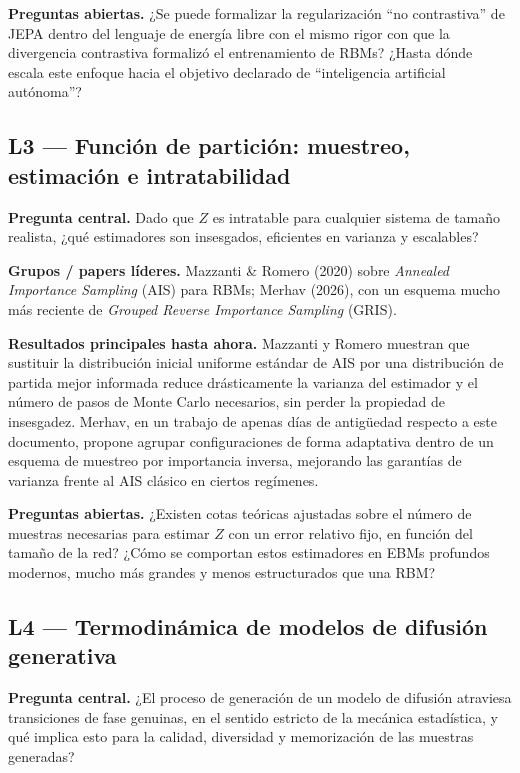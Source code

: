 \documentclass[12pt]{article}
\begin{document}
\textbf{Preguntas abiertas.} ¿Se puede formalizar la regularización ``no contrastiva'' de JEPA dentro del lenguaje de energía libre con el mismo rigor con que la divergencia contrastiva formalizó el entrenamiento de RBMs? ¿Hasta dónde escala este enfoque hacia el objetivo declarado de ``inteligencia artificial autónoma''?

\subsection{L3 --- Función de partición: muestreo, estimación e intratabilidad}

\textbf{Pregunta central.} Dado que $Z$ es intratable para cualquier sistema de tamaño realista, ¿qué estimadores son insesgados, eficientes en varianza y escalables?

\textbf{Grupos / papers líderes.} Mazzanti \& Romero (2020) sobre \emph{Annealed Importance Sampling} (AIS) para RBMs; Merhav (2026), con un esquema mucho más reciente de \emph{Grouped Reverse Importance Sampling} (GRIS).

\textbf{Resultados principales hasta ahora.} Mazzanti y Romero muestran que sustituir la distribución inicial uniforme estándar de AIS por una distribución de partida mejor informada reduce drásticamente la varianza del estimador y el número de pasos de Monte Carlo necesarios, sin perder la propiedad de insesgadez. Merhav, en un trabajo de apenas días de antigüedad respecto a este documento, propone agrupar configuraciones de forma adaptativa dentro de un esquema de muestreo por importancia inversa, mejorando las garantías de varianza frente al AIS clásico en ciertos regímenes.

\textbf{Preguntas abiertas.} ¿Existen cotas teóricas ajustadas sobre el número de muestras necesarias para estimar $Z$ con un error relativo fijo, en función del tamaño de la red? ¿Cómo se comportan estos estimadores en EBMs profundos modernos, mucho más grandes y menos estructurados que una RBM?

\subsection{L4 --- Termodinámica de modelos de difusión generativa}

\textbf{Pregunta central.} ¿El proceso de generación de un modelo de difusión atraviesa transiciones de fase genuinas, en el sentido estricto de la mecánica estadística, y qué implica esto para la calidad, diversidad y memorización de las muestras generadas?
\end{document}
